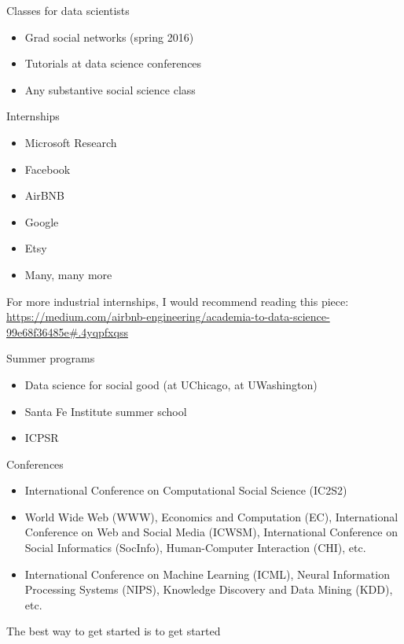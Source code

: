 \documentclass[aspectratio=169]{beamer}
\begin{document}
\begin{frame}

Classes for data scientists
\begin{itemize}
\item Grad social networks (spring 2016)
\item Tutorials at data science conferences
\item Any substantive social science class
\end{itemize}

\end{frame}
\begin{frame}

Internships
\begin{itemize}
\item Microsoft Research
\item Facebook
\item AirBNB
\item Google
\item Etsy
\item Many, many more
\end{itemize}

For more industrial internships, I would recommend reading this piece:
{\tiny \url{https://medium.com/airbnb-engineering/academia-to-data-science-99e68f36485e\#.4yqpfxqss}}

\end{frame}
\begin{frame}

Summer programs
\begin{itemize}
\item Data science for social good (at UChicago, at UWashington)
\item Santa Fe Institute summer school
\item ICPSR
\end{itemize}

\end{frame}
\begin{frame}

Conferences
\begin{itemize}
\item International Conference on Computational Social Science (IC2S2)
\item World Wide Web (WWW), Economics and Computation (EC), International Conference on Web and Social Media (ICWSM),  International Conference on Social Informatics (SocInfo), Human-Computer Interaction (CHI), etc.
\item International Conference on Machine Learning (ICML), Neural Information Processing Systems (NIPS), Knowledge Discovery and Data Mining (KDD), etc.
\end{itemize}

\end{frame}
\begin{frame}

The best way to get started is to get started

\end{frame}
\end{document}
